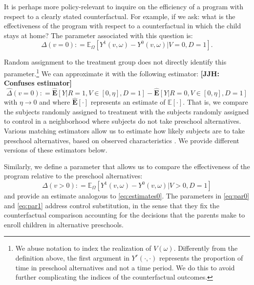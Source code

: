 It is perhaps more policy-relevant to inquire on the efficiency of a program with respect to a clearly stated counterfactual. For example, if we ask: what is the effectiveness of the program with respect to a counterfactual in which the child stays at home? The parameter associated with this question is:
\begin{equation}
\Delta \left( v = 0 \right) : =   \mathbb{E}_{\Omega} \left[ Y^1 \left( v, \omega \right) - Y^0 \left( v, \omega \right) | V = 0, D = 1 \right]. \label{eq:par0}
\end{equation}

Random assignment to the treatment group does not directly identify this parameter.\footnote{We abuse notation to index the realization of $V \left( \omega \right)$. Differently from the definition above, the first argument in $Y^r \left( \cdot, \cdot \right)$ represents the proportion of time in preschool alternatives and not a time period. We do this to avoid further complicating the indices of the counterfactual outcomes.} We can approximate it with the following estimator: \textbf{[JJH: Confuses estimator]}
\begin{equation}
\widehat{\Delta} \left( v = 0 \right) : = \widehat{\mathbf{E}} \left[ Y | R = 1, V \in \left[ 0 , \eta \right], D = 1 \right] - \widehat{\mathbf{E}} \left[ Y | R = 0, V \in \left[ 0 , \eta \right], D = 1 \right] \label{eq:estimates0}
\end{equation}
with $\eta \rightarrow 0$ and where $\widehat{\mathbf{E}}[\cdot]$ represents an estimate of $\mathbb{E}[\cdot]$. That is, we compare the subjects randomly assigned to treatment with the subjects randomly assigned to control in a neighborhood where subjects do not take preschool alternatives. Various matching estimators allow us to estimate how likely subjects are to take preschool alternatives, based on observed characteristics \citep{Heckman_Ichimura_etal_1997_REStud,Heckman_Ichimura_etal_1998_REStud}. We provide different versions of these estimators below.

Similarly, we define a parameter that allows us to compare the effectiveness of the program relative to the preschool alternatives:
\begin{equation}
\Delta \left( v > 0 \right) : =   \mathbb{E}_{\Omega} \left[ Y^1 \left( v, \omega \right) - Y^0 \left( v, \omega \right) | V > 0, D = 1 \right] \label{eq:par1}
\end{equation}
and provide an estimate analogous to \eqref{eq:estimates0}. The parameters in \eqref{eq:par0} and \eqref{eq:par1} address control substitution, in the sense that they fix the counterfactual comparison accounting for the decisions that the parents make to enroll children in alternative preschools.


